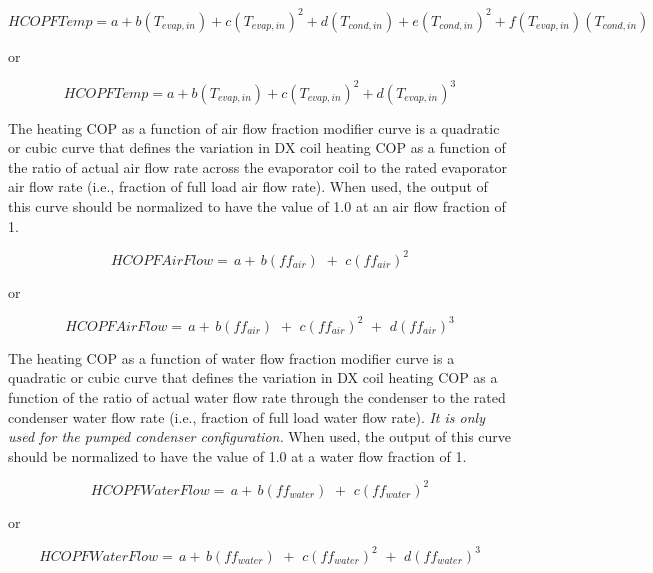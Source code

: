 \begin{equation}
HCOPFTemp = a + b\left( {{T_{evap,in}}} \right) + c{\left( {{T_{evap,in}}} \right)^2} + d\left( {{T_{cond,in}}} \right) + e{\left( {{T_{cond,in}}} \right)^2} + f\left( {{T_{evap,in}}} \right)\left( {{T_{cond,in}}} \right)
\end{equation}

or

\begin{equation}
HCOPFTemp = a + b\left( {{T_{evap,in}}} \right) + c{\left( {{T_{evap,in}}} \right)^2} + d{\left( {{T_{evap,in}}} \right)^3}
\end{equation}

The heating COP as a function of air flow fraction modifier curve is a quadratic or cubic curve that defines the variation in DX coil heating COP as a function of the ratio of actual air flow rate across the evaporator coil to the rated evaporator air flow rate (i.e., fraction of full load air flow rate). When used, the output of this curve should be normalized to have the value of 1.0 at an air flow fraction of 1.

\begin{equation}
HCOPFAirFlow = \,a + \,b\left( {f{f_{air}}} \right)\,\, + \,\,c{\left( {f{f_{air}}} \right)^2}
\end{equation}

or

\begin{equation}
HCOPFAirFlow = \,a + \,b\left( {f{f_{air}}} \right)\,\, + \,\,c{\left( {f{f_{air}}} \right)^2}\,\, + \,\,d{\left( {f{f_{air}}} \right)^3}
\end{equation}

The heating COP as a function of water flow fraction modifier curve is a quadratic or cubic curve that defines the variation in DX coil heating COP as a function of the ratio of actual water flow rate through the condenser to the rated condenser water flow rate (i.e., fraction of full load water flow rate). \emph{It is only used for the pumped condenser configuration.} When used, the output of this curve should be normalized to have the value of 1.0 at a water flow fraction of 1.

\begin{equation}
HCOPFWaterFlow = \,a + \,b\left( {f{f_{water}}} \right)\,\, + \,\,c{\left( {f{f_{water}}} \right)^2}
\end{equation}

or

\begin{equation}
HCOPFWaterFlow = \,a + \,b\left( {f{f_{water}}} \right)\,\, + \,\,c{\left( {f{f_{water}}} \right)^2}\,\, + \,\,d{\left( {f{f_{water}}} \right)^3}
\end{equation}

